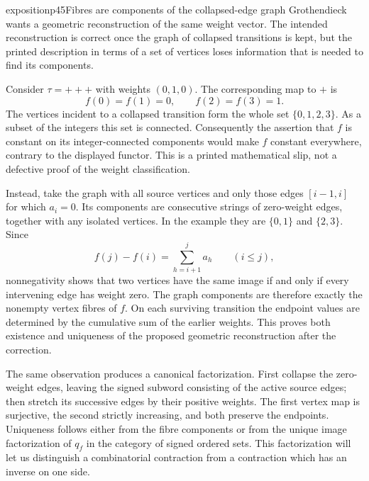 \begin{dcomment}{exposition}{p45}{Fibres are components of the collapsed-edge graph}
Grothendieck wants a geometric reconstruction of the same weight vector. The intended reconstruction is correct once the graph of collapsed transitions is kept, but the printed description in terms of a set of vertices loses information that is needed to find its components.

Consider $\tau=+++$ with weights $(0,1,0)$. The corresponding map to $+$ is
\[
 f(0)=f(1)=0,\qquad f(2)=f(3)=1.
\]
The vertices incident to a collapsed transition form the whole set $\{0,1,2,3\}$. As a subset of the integers this set is connected. Consequently the assertion that $f$ is constant on its integer-connected components would make $f$ constant everywhere, contrary to the displayed functor. This is a printed mathematical slip, not a defective proof of the weight classification.

Instead, take the graph with all source vertices and only those edges $[i-1,i]$ for which $a_i=0$. Its components are consecutive strings of zero-weight edges, together with any isolated vertices. In the example they are $\{0,1\}$ and $\{2,3\}$. Since
\[
 f(j)-f(i)=\sum_{h=i+1}^{j}a_h\qquad(i\leq j),
\]
nonnegativity shows that two vertices have the same image if and only if every intervening edge has weight zero. The graph components are therefore exactly the nonempty vertex fibres of $f$. On each surviving transition the endpoint values are determined by the cumulative sum of the earlier weights. This proves both existence and uniqueness of the proposed geometric reconstruction after the correction.

The same observation produces a canonical factorization. First collapse the zero-weight edges, leaving the signed subword consisting of the active source edges; then stretch its successive edges by their positive weights. The first vertex map is surjective, the second strictly increasing, and both preserve the endpoints. Uniqueness follows either from the fibre components or from the unique image factorization of $q_f$ in the category of signed ordered sets. This factorization will let us distinguish a combinatorial contraction from a contraction which has an inverse on one side.
\end{dcomment}


